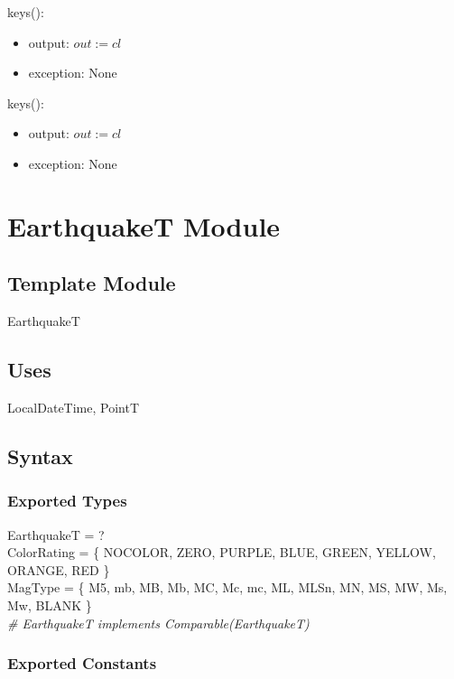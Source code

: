 \documentclass[12pt]{article}
\begin{document}
\noindent keys():
\begin{itemize}
\item output: $out := cl$
\item exception: None
\end{itemize}

\noindent keys():
\begin{itemize}
\item output: $out := cl$
\item exception: None
\end{itemize}

\newpage

\section* {EarthquakeT Module}

\subsection* {Template Module}

EarthquakeT

\subsection* {Uses}

LocalDateTime, PointT

\subsection* {Syntax}

\subsubsection* {Exported Types}

EarthquakeT = ?\\

\noindent ColorRating = \{ NOCOLOR, ZERO, PURPLE, BLUE, GREEN, YELLOW, ORANGE, RED \}\\

\noindent MagType = \{ M5, mb, MB, Mb, MC, Mc, mc, ML, MLSn, MN, MS, MW, Ms, Mw, BLANK \}\\

\noindent \textit{\# EarthquakeT implements Comparable(EarthquakeT)}

\subsubsection* {Exported Constants}
\end{document}
